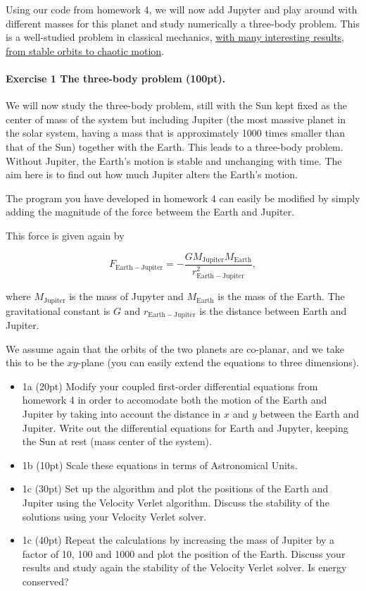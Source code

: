 \documentclass[%
oneside,                 %
final,                   %
10pt]{article}
\begin{document}
Using our code from homework 4, we will now add Jupyter and play
around with different masses for this planet and study numerically a
three-body problem.  This is a well-studied problem in classical
mechanics, \href{{https://en.wikipedia.org/wiki/Three-body_problem}}{with many interesting results, from stable orbits to chaotic motion}.

\paragraph{Exercise 1 The three-body problem (100pt).}
We will now study the three-body problem, still with the Sun kept
fixed as the center of mass of the system but including Jupiter (the
most massive planet in the solar system, having a mass that is
approximately 1000 times smaller than that of the Sun) together with
the Earth. This leads to a three-body problem. Without Jupiter, the
Earth's motion is stable and unchanging with time. The aim here is to
find out how much Jupiter alters the Earth's motion.

The program you have developed in homework 4 can easily be modified by
simply adding the magnitude of the force betweem the Earth and
Jupiter.

This force is given again by

\[
F_{\mathrm{Earth-Jupiter}}=-\frac{GM_{\mathrm{Jupiter}}M_{\mathrm{Earth}}}{r_{\mathrm{Earth-Jupiter}}^2},
\]

where $M_{\mathrm{Jupiter}}$ is the mass of Jupyter and
$M_{\mathrm{Earth}}$ is the mass of the Earth.  The gravitational constant
is $G$ and $r_{\mathrm{Earth-Jupiter}}$ is the distance between Earth
and Jupiter.

We assume again that the orbits of the two planets are co-planar, and
we take this to be the $xy$-plane (you can easily extend the equations
to three dimensions).

\begin{itemize}
\item 1a (20pt) Modify your coupled first-order differential equations from homework 4 in order to accomodate both the motion of the Earth and Jupiter by taking into account the distance in $x$ and $y$ between the Earth and Jupiter. Write out the differential equations for  Earth and Jupyter, keeping the Sun at rest (mass center of the system).

\item 1b (10pt) Scale these equations in terms of Astronomical Units.

\item 1c (30pt) Set up the algorithm and plot the positions of the Earth and Jupiter using the Velocity Verlet algorithm. Discuss the stability of the solutions using your Velocity Verlet solver.

\item 1c (40pt)  Repeat the calculations by increasing the mass of Jupiter by a factor of 10, 100 and 1000 and plot the position of the Earth.  Discuss your results and study again the stability of the Velocity Verlet solver. Is energy conserved? 
\end{itemize}
\end{document}
